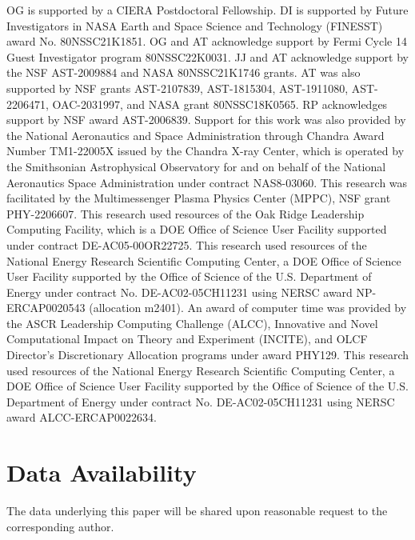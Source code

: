 \documentclass[twocolumn,dvipsnames]{aastex62}
\begin{document}
\begin{acknowledgements}

OG is supported by a CIERA Postdoctoral Fellowship.
DI is supported by Future Investigators in NASA Earth and Space Science and Technology (FINESST) award No. 80NSSC21K1851. %
OG and AT acknowledge support by Fermi Cycle 14 Guest Investigator program 80NSSC22K0031.
JJ and AT acknowledge support by the NSF AST-2009884 and NASA 80NSSC21K1746 grants.
AT was also supported by NSF grants
AST-2107839, %
AST-1815304, %
AST-1911080, %
AST-2206471,
OAC-2031997, %
and NASA grant 80NSSC18K0565. %
RP acknowledges
support by NSF award AST-2006839.
Support for this work was also provided by the National Aeronautics and Space Administration through Chandra Award Number TM1-22005X issued by the Chandra X-ray Center, which is operated by the Smithsonian Astrophysical Observatory for and on behalf of the National Aeronautics Space Administration under contract NAS8-03060.  This research was facilitated by the Multimessenger Plasma Physics Center (MPPC), NSF grant PHY-2206607.
This research used resources of the Oak Ridge Leadership Computing Facility, which is a DOE Office of Science User Facility supported under contract DE-AC05-00OR22725. This research used resources of the National Energy Research Scientific Computing Center, a DOE Office of Science User Facility supported by the Office of Science of the U.S. Department of Energy under contract No. DE-AC02-05CH11231 using
NERSC award NP-ERCAP0020543 (allocation m2401). An award of computer time was provided by the ASCR Leadership Computing Challenge (ALCC), Innovative and Novel Computational Impact on Theory and Experiment (INCITE), and OLCF Director's Discretionary Allocation  programs under award PHY129. This research used resources of the National Energy Research Scientific Computing Center, a DOE Office of Science User Facility supported by the Office of Science of the U.S. Department of Energy under contract No. DE-AC02-05CH11231 using NERSC award ALCC-ERCAP0022634.
    
\end{acknowledgements}

\section*{Data Availability}

The data underlying this paper will be shared upon reasonable request to the corresponding author.
	
\end{document}
